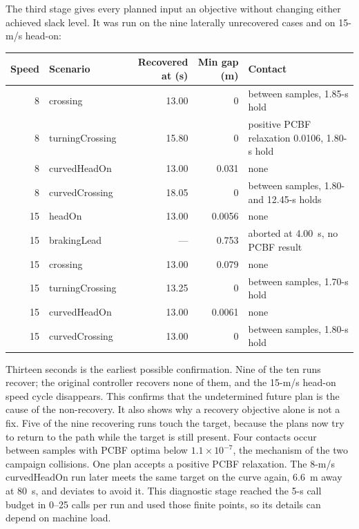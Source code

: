 \documentclass[11pt]{article}
\begin{document}
The third stage gives every planned input an objective without changing either
achieved slack level. It was run on the nine laterally unrecovered cases and on
15-m/s head-on:
\begin{center}\footnotesize
\begin{tabular}{rlrrl}
\toprule
Speed & Scenario & Recovered at (s) & Min gap (m) & Contact\\
\midrule
8 & crossing & 13.00 & 0 & between samples, 1.85-s hold\\
8 & turningCrossing & 15.80 & 0 & positive PCBF relaxation 0.0106, 1.80-s hold\\
8 & curvedHeadOn & 13.00 & 0.031 & none\\
8 & curvedCrossing & 18.05 & 0 & between samples, 1.80- and 12.45-s holds\\
15 & headOn & 13.00 & 0.0056 & none\\
15 & brakingLead & --- & 0.753 & aborted at 4.00~s, no PCBF result\\
15 & crossing & 13.00 & 0.079 & none\\
15 & turningCrossing & 13.25 & 0 & between samples, 1.70-s hold\\
15 & curvedHeadOn & 13.00 & 0.0061 & none\\
15 & curvedCrossing & 13.00 & 0 & between samples, 1.80-s hold\\
\bottomrule
\end{tabular}\end{center}
Thirteen seconds is the earliest possible confirmation. Nine of the ten runs
recover; the original controller recovers none of them, and the 15-m/s head-on
speed cycle disappears. This confirms that the undetermined future plan is the
cause of the non-recovery. It also shows why a recovery objective alone is not
a fix. Five of the nine recovering runs touch the target, because the plans now
try to return to the path while the target is still present. Four contacts occur between samples with PCBF optima below
$1.1\times10^{-7}$, the mechanism of the two campaign collisions. One plan accepts
a positive PCBF relaxation. The 8-m/s curvedHeadOn run later meets the same target
on the curve again, 6.6~m away at 80~s, and deviates to avoid it. This
diagnostic stage reached the 5-s call budget in 0--25 calls per run and used those
finite points, so its details can depend on machine load.
\end{document}
